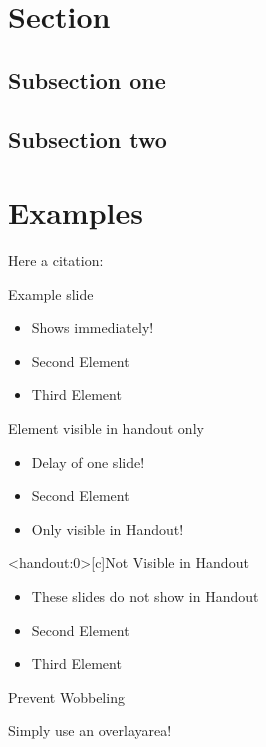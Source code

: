 \section{Section}

\subsection{Subsection one}
\subsection{Subsection two}


\section{Examples}

\begin{frame}[c]
     Here a citation: \cite{benchcpp}
\end{frame}


\begin{frame}[c]{Example slide}
    \Large
    \begin{itemize}[<+->]
        \item Shows immediately!
        \item Second Element
        \item Third Element
    \end{itemize}
\end{frame}


\begin{frame}[c]{Element visible in handout only}
    \Large
    \begin{itemize}[<+(1)->]
        \item Delay of one slide!
        \item Second Element
        \item<handout> Only visible in Handout!
    \end{itemize}
\end{frame}


\begin{frame}<handout:0>[c]{Not Visible in Handout}
    \Large
    \begin{itemize}[<+(1)->]
        \item These slides do not show in Handout
        \item Second Element
        \item Third Element
    \end{itemize}
\end{frame}


\begin{frame}[c]{Prevent Wobbeling}

    Simply use an overlayarea!


\end{frame}
